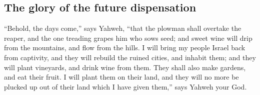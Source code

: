\begin{paracol}{2}
\begin{otherlanguage}{english}
\hypertarget{the-glory-of-the-future-dispensation}{%
\subsection{The glory of the future
dispensation}\label{the-glory-of-the-future-dispensation}}

 ``Behold, the days come,'' says Yahweh, ``that the
plowman shall overtake the reaper, and the one treading grapes him who
sows seed; and sweet wine will drip from the mountains, and flow from
the hills.  I will bring my people Israel back from
captivity, and they will rebuild the ruined cities, and inhabit them;
and they will plant vineyards, and drink wine from them. They shall also
make gardens, and eat their fruit.  I will plant them on
their land, and they will no more be plucked up out of their land which
I have given them,'' says Yahweh your God.
\end{otherlanguage} \end{paracol}
